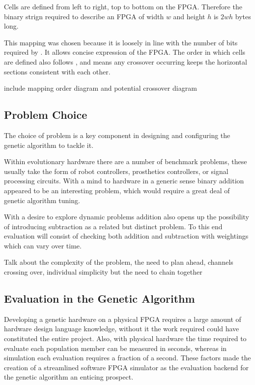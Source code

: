 Cells are defined from left to right, top to bottom on the FPGA. Therefore the
binary strign required to describe an FPGA of width $w$ and height $h$ is $2wh$
bytes long.

This mapping was chosen because it is loosely in line with the number of bits
required by \cite{10.1007/3-540-63173-9_61}. It allows concise expression of
the FPGA. The order in which cells are defined also follows
\cite{10.1007/3-540-63173-9_61}, and means any crossover occurring keeps
the horizontal sections consistent with each other.

\todo include mapping order diagram and potential crossover diagram

\subsection{Problem Choice}

The choice of problem is a key component in designing and configuring the genetic
algorithm to tackle it.

Within evolutionary hardware there are a number of benchmark problems, these usually
take the form of robot controllers, prosthetics controllers, or signal processing
circuits. With a mind to hardware in a generic sense binary addition appeared to be
an interesting problem, which would require a great deal of genetic algorithm tuning.

With a desire to explore dynamic problems addition also opens up the possibility of
introducing subtraction as a related but distinct problem. To this end evaluation
will consist of checking both addition and subtraction with weightings which can
vary over time.

\todo Talk about the complexity of the problem, the need to plan ahead, channels crossing over,
individual simplicity but the need to chain together

\subsection{Evaluation in the Genetic Algorithm}

Developing a genetic hardware on a physical FPGA requires a large amount of hardware
design language knowledge, without it the work required could have constituted the
entire project. Also, with physical hardware the time required to evaluate each
population member can be measured in seconds, whereas in simulation each evaluation
requires a fraction of a second. These factors made the creation of a
streamlined software FPGA simulator as the evaluation backend for the
genetic algorithm an enticing prospect.

